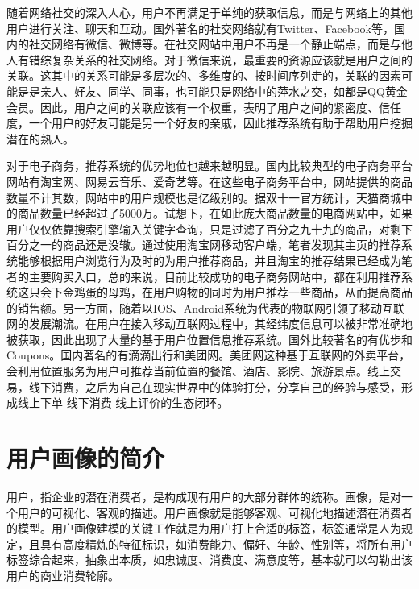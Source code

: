 	随着网络社交的深入人心，用户不再满足于单纯的获取信息，而是与网络上的其他用户进行关注、聊天和互动。国外著名的社交网络就有Twitter、Facebook等，国内的社交网络有微信、微博等。在社交网站中用户不再是一个静止端点，而是与他人有错综复杂关系的社交网络。对于微信来说，最重要的资源应该就是用户之间的关联。这其中的关系可能是多层次的、多维度的、按时间序列走的，关联的因素可能是是亲人、好友、同学、同事，也可能只是网络中的萍水之交，如都是QQ黄金会员。因此，用户之间的关联应该有一个权重，表明了用户之间的紧密度、信任度，一个用户的好友可能是另一个好友的亲戚，因此推荐系统有助于帮助用户挖掘潜在的熟人。

	对于电子商务，推荐系统的优势地位也越来越明显。国内比较典型的电子商务平台网站有淘宝网、网易云音乐、爱奇艺等。在这些电子商务平台中，网站提供的商品数量不计其数，网站中的用户规模也是亿级别的。据双十一官方统计，天猫商城中的商品数量已经超过了5000万。试想下，在如此庞大商品数量的电商网站中，如果用户仅仅依靠搜索引擎输入关键字查询，只是过滤了百分之九十九的商品，对剩下百分之一的商品还是没辙。通过使用淘宝网移动客户端，笔者发现其主页的推荐系统能够根据用户浏览行为及时的为用户推荐商品，并且淘宝的推荐结果已经成为笔者的主要购买入口，总的来说，目前比较成功的电子商务网站中，都在利用推荐系统这只会下金鸡蛋的母鸡，在用户购物的同时为用户推荐一些商品，从而提高商品的销售额。另一方面，随着以IOS、Android系统为代表的物联网引领了移动互联网的发展潮流。在用户在接入移动互联网过程中，其经纬度信息可以被非常准确地被获取，因此出现了大量的基于用户位置信息推荐系统。国外比较著名的有优步和Coupons。国内著名的有滴滴出行和美团网。美团网这种基于互联网的外卖平台，会利用位置服务为用户可推荐当前位置的餐馆、酒店、影院、旅游景点。线上交易，线下消费，之后为自己在现实世界中的体验打分，分享自己的经验与感受，形成线上下单-线下消费-线上评价的生态闭环。

	

\section{用户画像的简介}
	用户，指企业的潜在消费者，是构成现有用户的大部分群体的统称。画像，是对一个用户的可视化、客观的描述。用户画像就是能够客观、可视化地描述潜在消费者的模型。用户画像建模的关键工作就是为用户打上合适的标签，标签通常是人为规定，且具有高度精炼的特征标识，如消费能力、偏好、年龄、性别等，将所有用户标签综合起来，抽象出本质，如忠诚度、消费度、满意度等，基本就可以勾勒出该用户的商业消费轮廓。
